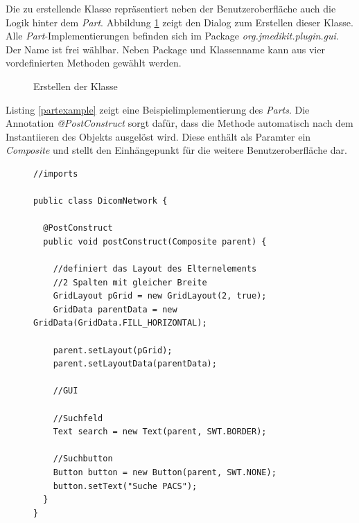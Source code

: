 Die zu erstellende Klasse repräsentiert neben der Benutzeroberfläche auch die Logik hinter dem \textit{Part}. Abbildung \ref{partclass} zeigt den Dialog zum Erstellen dieser Klasse. Alle \textit{Part}-Implementierungen befinden sich im Package \textit{org.jmedikit.plugin.gui}. Der Name ist frei wählbar. Neben Package und Klassenname kann aus vier vordefinierten Methoden gewählt werden.

\begin{figure}[H]
  \vspace{0.5cm}
  \centering
   \caption{Erstellen der Klasse}
  \label{partclass}
  \vspace{0.5cm}
\end{figure}

Listing \ref{partexample} zeigt eine Beispielimplementierung des \textit{Parts}. Die Annotation \textit{@PostConstruct} sorgt dafür, dass die Methode automatisch nach dem Instantiieren des Objekts ausgelöst wird. Diese enthält als Paramter ein \textit{Composite} und stellt den Einhängepunkt für die weitere Benutzeroberfläche dar.

\begin{figure}[htbp]
\begin{lstlisting}[frame=leftline]
//imports

public class DicomNetwork {

  @PostConstruct
  public void postConstruct(Composite parent) {
	
    //definiert das Layout des Elternelements
    //2 Spalten mit gleicher Breite
    GridLayout pGrid = new GridLayout(2, true);
    GridData parentData = new GridData(GridData.FILL_HORIZONTAL);
    
    parent.setLayout(pGrid);
    parent.setLayoutData(parentData);

    //GUI

    //Suchfeld
    Text search = new Text(parent, SWT.BORDER);
    
    //Suchbutton
    Button button = new Button(parent, SWT.NONE);
    button.setText("Suche PACS");	
  }	
}
\end{lstlisting}
\end{figure}

